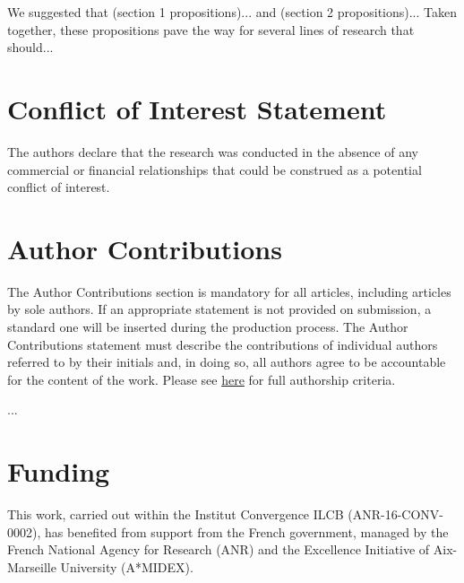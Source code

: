 \documentclass[utf8]{template/frontiersSCNS} %
\begin{document}
We suggested that (section 1 propositions)... and (section 2 propositions)... Taken together, these propositions pave the way for several lines of research that should...

\section*{Conflict of Interest Statement}


The authors declare that the research was conducted in the absence of any commercial or financial relationships that could be construed as a potential conflict of interest.

\section*{Author Contributions}

\color{blue}

The Author Contributions section is mandatory for all articles, including articles by sole authors. If an appropriate statement is not provided on submission, a standard one will be inserted during the production process. The Author Contributions statement must describe the contributions of individual authors referred to by their initials and, in doing so, all authors agree to be accountable for the content of the work. Please see  \href{http://home.frontiersin.org/about/author-guidelines#AuthorandContributors}{here} for full authorship criteria.

\color{black}

...

\section*{Funding}


This work, carried out within the Institut Convergence ILCB (ANR-16-CONV-0002), has benefited from support from the French government, managed by the French National Agency for Research (ANR) and the Excellence Initiative of Aix-Marseille University (A*MIDEX).
\end{document}
